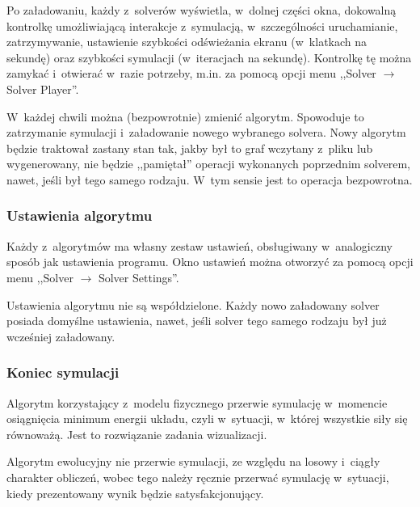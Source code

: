 \documentclass[a4paper,onecolumn,oneside,12pt]{mwart}
\begin{document}
Po załadowaniu, każdy z~solverów wyświetla, w~dolnej części okna, dokowalną
kontrolkę umożliwiającą interakcje z~symulacją, w~szczególności
uruchamianie, zatrzymywanie, ustawienie szybkości odświeżania ekranu
(w~klatkach na sekundę) oraz szybkości symulacji (w~iteracjach na sekundę).
Kontrolkę tę można zamykać i~otwierać w~razie potrzeby, m.in. za pomocą
opcji menu ,,Solver $\rightarrow$ Solver Player''.

W~każdej chwili można (bezpowrotnie) zmienić algorytm. Spowoduje to
zatrzymanie symulacji i~załadowanie nowego wybranego solvera. Nowy algorytm
będzie traktował zastany stan tak, jakby był to graf wczytany z~pliku lub
wygenerowany, nie będzie ,,pamiętał'' operacji wykonanych poprzednim
solverem, nawet, jeśli był tego samego rodzaju. W~tym sensie jest to
operacja bezpowrotna.

\subsubsection{Ustawienia algorytmu}

Każdy z~algorytmów ma własny zestaw ustawień, obsługiwany w~analogiczny
sposób jak ustawienia programu. Okno ustawień można otworzyć za pomocą
opcji menu ,,Solver $\rightarrow$ Solver Settings''.

Ustawienia algorytmu nie są współdzielone. Każdy nowo załadowany solver
posiada domyślne ustawienia, nawet, jeśli solver tego samego rodzaju był
już wcześniej załadowany.

\subsubsection{Koniec symulacji}

Algorytm korzystający z~modelu fizycznego przerwie symulację w~momencie
osiągnięcia minimum energii układu, czyli w~sytuacji, w~której wszystkie
siły się równoważą. Jest to rozwiązanie zadania wizualizacji.

Algorytm ewolucyjny nie przerwie symulacji, ze względu na losowy i~ciągły
charakter obliczeń, wobec tego należy ręcznie przerwać symulację
w~sytuacji, kiedy prezentowany wynik będzie satysfakcjonujący.
\end{document}
